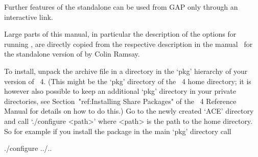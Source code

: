 
Further features  of the {\ACE} standalone  can be used  from GAP only
through an interactive link.

%
%
%
%




Large parts of  this manual, in particular      the description of the
options for  running {\ACE}, are  directly copied from  the respective
description in  the manual~\cite{Ram99} for the  standalone version of
{\ACE} by Colin Ramsay.



To  install, unpack  the  archive file  in  a directory  in the  `pkg'
hierarchy  of your  version  of  {\GAP}~4. (This  might  be the  `pkg'
directory of the {\GAP}~4 home  directory; it is however also possible
to keep an additional `pkg' directory in your private directories, see
Section~"ref:Installing  Share Packages"  of  the {\GAP}~4   Reference
Manual for details  on how to do this.) Go to  the newly created `ACE'
directory and  call `./configure <path>'  where <path> is the  path to
the {\GAP} home  directory. So for example if  you install the package
in the main `pkg' directory call

\begintt
./configure ../..
\endtt

